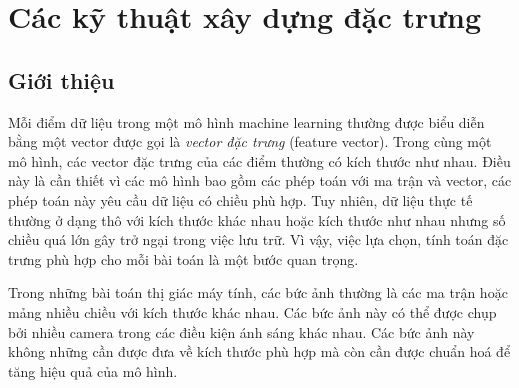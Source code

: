 \chapter{Các kỹ thuật xây dựng đặc trưng}
\label{cha:feature} 
 
\section{Giới thiệu }
 

Mỗi điểm dữ liệu trong một mô hình machine learning thường được biểu diễn bằng
một vector được gọi là \textit{vector đặc trưng} (feature vector). Trong cùng một mô hình, các
vector đặc trưng của các điểm thường có kích thước như nhau. Điều này là cần
thiết vì các mô hình bao gồm các phép toán với ma trận và vector, các phép toán
này yêu cầu dữ liệu có chiều phù hợp. Tuy nhiên, dữ liệu thực tế thường ở dạng
thô với kích thước khác nhau hoặc kích thước như nhau nhưng số chiều quá lớn gây
trở ngại trong việc lưu trữ. Vì vậy, việc lựa chọn, tính toán đặc trưng phù hợp
cho mỗi bài toán là một bước quan trọng.

Trong những bài toán {thị giác máy tính}, các bức ảnh thường là các ma trận hoặc
mảng nhiều chiều với kích thước khác nhau. Các bức ảnh này có thể được chụp bởi nhiều camera trong các điều kiện ánh sáng khác nhau. Các bức ảnh này không những cần được đưa về kích thước phù hợp mà còn cần được chuẩn hoá để tăng hiệu quả của mô hình. 


